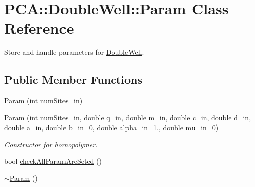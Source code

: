 \hypertarget{class_p_c_a_1_1_double_well_1_1_param}{}\section{P\+CA\+:\+:Double\+Well\+:\+:Param Class Reference}
\label{class_p_c_a_1_1_double_well_1_1_param}


Store and handle parameters for \hyperlink{class_p_c_a_1_1_double_well}{Double\+Well}.  


\subsection*{Public Member Functions}
\begin{DoxyCompactItemize}
\item 
\hyperlink{class_p_c_a_1_1_double_well_1_1_param_a412abf38a6dd3dc886415d16dde03fb4}{Param} (int num\+Sites\+\_\+in)
\item 
\hyperlink{class_p_c_a_1_1_double_well_1_1_param_a8557df1fe94ffb4fb87958d107705910}{Param} (int num\+Sites\+\_\+in, double q\+\_\+in, double m\+\_\+in, double c\+\_\+in, double d\+\_\+in, double a\+\_\+in, double b\+\_\+in=0, double alpha\+\_\+in=1., double mu\+\_\+in=0)
\begin{DoxyCompactList}\small\item\em Constructor for homopolymer. \end{DoxyCompactList}\item 
bool \hyperlink{class_p_c_a_1_1_double_well_1_1_param_a8dcbc0e63b75467a3797f2478be2eb28}{check\+All\+Param\+Are\+Seted} ()
\item 
\hyperlink{class_p_c_a_1_1_double_well_1_1_param_a8369b33896b97469e73d0ca14ccf6315}{$\sim$\+Param} ()
\end{DoxyCompactItemize}
